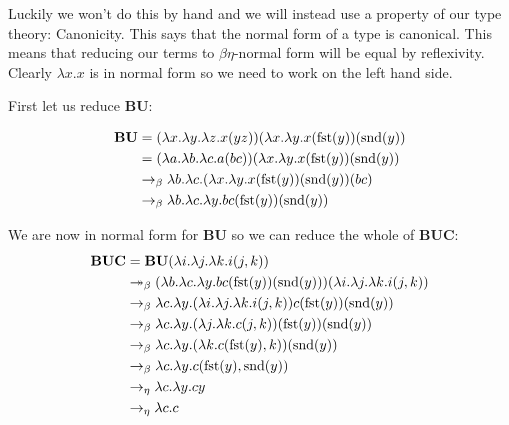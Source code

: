 \begin{example}
\begin{example}
    Luckily we won't do this by hand and we will instead use a property of our type theory: Canonicity. This says that the normal form of a type is canonical. This means that reducing our terms to $\beta \eta$-normal form will be equal by reflexivity. Clearly $\lambda x . x$ is in normal form so we need to work on the left hand side.
    
    First let us reduce $\mathbf{B} \mathbf{U}$:
    
    \begin{equation*}
        \begin{aligned}
            \mathbf{B} \mathbf{U} &= (\lambda x . \lambda y . \lambda z . x (y z)) (\lambda x .\lambda y. x (\mathrm{fst}(y))(\mathrm{snd}(y)) \\
            &= (\lambda a . \lambda b . \lambda c . a (b c)) (\lambda x .\lambda y. x (\mathrm{fst}(y))(\mathrm{snd}(y)) \\
            &\to_{\beta} \lambda b . \lambda c . (\lambda x .\lambda y. x (\mathrm{fst}(y))(\mathrm{snd}(y)) (b c)  \\
            &\to_{\beta} \lambda b . \lambda c . \lambda y. b c(\mathrm{fst}(y))(\mathrm{snd}(y))  \\
        \end{aligned}
    \end{equation*}
    
    We are now in normal form for $\mathbf{B} \mathbf{U}$ so we can reduce the whole of $\mathbf{B} \mathbf{U} \mathbf{C}$:
    \begin{equation*}
        \begin{aligned}
            \mathbf{B} \mathbf{U} \mathbf{C} &= \mathbf{B} \mathbf{U} (\lambda i . \lambda j . \lambda k . i (j , k)) \\
            &\twoheadrightarrow_{\beta} (\lambda b . \lambda c . \lambda y. b c(\mathrm{fst}(y))(\mathrm{snd}(y))) (\lambda i . \lambda j . \lambda k . i (j , k)) \\
            &\to_{\beta} \lambda c . \lambda y.  (\lambda i . \lambda j . \lambda k . i (j , k)) c(\mathrm{fst}(y))(\mathrm{snd}(y)) \\
            &\to_{\beta} \lambda c . \lambda y.  (\lambda j . \lambda k . c (j , k)) (\mathrm{fst}(y))(\mathrm{snd}(y)) \\
            &\to_{\beta} \lambda c . \lambda y.  (\lambda k . c (\mathrm{fst}(y) , k)) (\mathrm{snd}(y)) \\
            &\to_{\beta} \lambda c . \lambda y.  c (\mathrm{fst}(y) , \mathrm{snd}(y))  \\
            &\to_{\eta} \lambda c . \lambda y . c y \\
            &\to_{\eta} \lambda c . c
        \end{aligned}
    \end{equation*}
    

\end{example}
\end{example}
